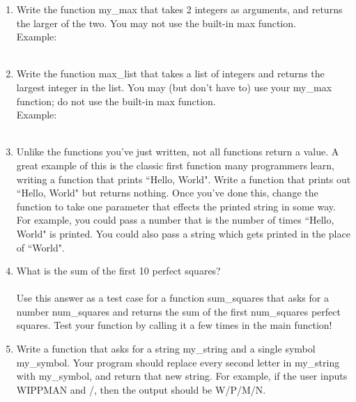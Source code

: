 \documentclass[11pt, letterpaper, onecolumn, oneside, final]{article}
\begin{document}
\begin{enumerate}
\begin{enumerate}
\item Write the function {\consolas my\_max} that takes 2 integers as arguments, and returns the larger of the two. You may not use the built-in max function.\\ Example: \\
\\


\item Write the function {\consolas max\_list} that takes a list of integers and returns the largest integer in the
list. You may (but don’t have to) use your {\consolas my\_max} function; do not use the built-in max function. \\
Example: \\ 
\\

\item Unlike the functions you've just written, not all functions return a value. A great example of this is the classic first function many programmers learn, writing a function that prints \textquotedblleft Hello, World". Write a function that prints out \textquotedblleft  Hello, World" but returns nothing. Once you've done this, change the function to take one parameter that effects the printed string in some way. For example, you could pass a number that is the number of times \textquotedblleft Hello, World" is printed. You could also pass a string which gets printed in the place of \textquotedblleft World".\\

\item What is the sum of the first 10 perfect squares?\\\\
Use this answer as a test case for a function {\consolas sum\_squares} that asks for a number {\consolas num\_squares} and returns the sum of the first {\consolas num\_squares} perfect squares. Test your function by calling it a few times in the main function!\\

\item Write a function that asks for a string {\consolas my\_string} and a single symbol {\consolas my\_symbol}. Your program should replace every second letter in {\consolas my\_string} with {\consolas my\_symbol}, and return that new string.
For example, if the user inputs {\consolas WIPPMAN} and {\consolas /}, then the output should be {\consolas W/P/M/N}.\\


\end{enumerate}
\end{enumerate}
\end{document}
